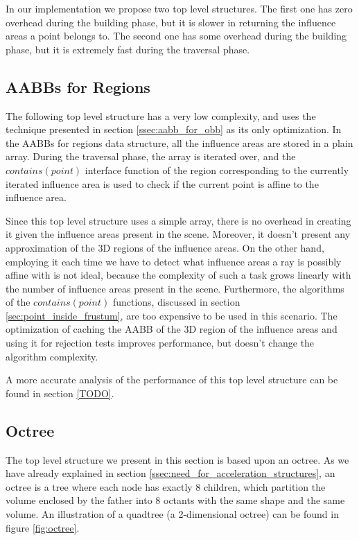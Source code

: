 \documentclass{PoliMi_MasterThesis}
\begin{document}
In our implementation we propose two top level structures. The first one has zero overhead during the building phase, but it is slower in returning the influence areas a point belongs to. The second one has some overhead during the building phase, but it is extremely fast during the traversal phase.

\subsection{AABBs for Regions} \label{ssec:top_level_aabbs}
The following top level structure has a very low complexity, and uses the technique presented in section \ref{ssec:aabb_for_obb} as its only optimization.
In the AABBs for regions data structure, all the influence areas are stored in a plain array. During the traversal phase, the array is iterated over, and the $contains(point)$ interface function of the region corresponding to the currently iterated influence area is used to check if the current point is affine to the influence area.

Since this top level structure uses a simple array, there is no overhead in creating it given the influence areas present in the scene. Moreover, it doesn't present any approximation of the 3D regions of the influence areas. On the other hand, employing it each time we have to detect what influence areas a ray is possibly affine with is not ideal, because the complexity of such a task grows linearly with the number of influence areas present in the scene. Furthermore, the algorithms of the $contains(point)$ functions, discussed in section \ref{sec:point_inside_frustum}, are too expensive to be used in this scenario. The optimization of caching the AABB of the 3D region of the influence areas and using it for rejection tests improves performance, but doesn't change the algorithm complexity.

A more accurate analysis of the performance of this top level structure can be found in section \ref{TODO}.

\subsection{Octree} \label{ssec:top_level_octree}
The top level structure we present in this section is based upon an octree. As we have already explained in section \ref{ssec:need_for_acceleration_structures}, an octree is a tree where each node has exactly 8 children, which partition the volume enclosed by the father into 8 octants with the same shape and the same volume. An illustration of a quadtree (a 2-dimensional octree) can be found in figure \ref{fig:octree}.
\end{document}
